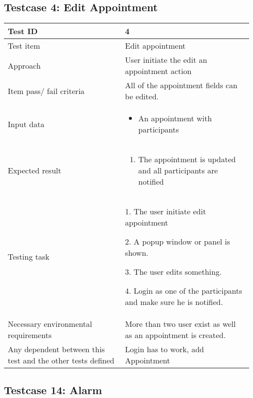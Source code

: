 \documentclass[a4paper, 10pt]{article}
\begin{document}
\subsection{Testcase 4: Edit Appointment}

\begin{tabularx}{\textwidth}{ |X|X| }
\hline
\rowcolor{Gray}
Test ID & 4 \\ \hline
Test item & Edit appointment \\ \hline
Approach & User initiate the edit an appointment action \\ \hline
Item pass/ fail criteria & All of the appointment fields can be edited.\\ \hline
Input data & 
\begin{itemize}
	\item An appointment with participants
\end{itemize}\\ \hline
Expected result & 
\begin{enumerate}
	\item The appointment is updated and all participants are notified
\end{enumerate} \\ \hline
Testing task &
\begin{task steps}
	\item 1. The user initiate edit appointment
	\item 2. A popup window or panel is shown. 
	\item 3. The user edits something.
	\item 4. Login as one of the participants and make sure he is notified. 
\end{task steps}	\\ \hline
Necessary environmental requirements & More than two user exist as well as an appointment is created.   \\ \hline
Any dependent between this test and the other tests defined & Login has to work, add Appointment  \\ \hline

\end{tabularx}

\subsection{Testcase 14: Alarm}
\end{document}
